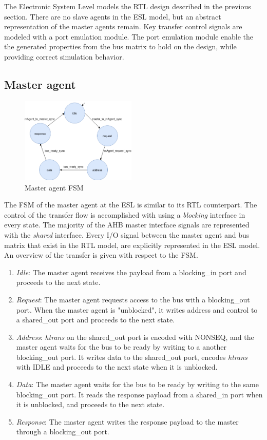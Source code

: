 The Electronic System Level models the RTL design described in the previous section. There are no slave agents in the ESL model, but an abstract representation of the master agents remain. Key transfer control signals are modeled with a port emulation module. The port emulation module enable the the generated properties from the bus matrix to hold on the design, while providing correct simulation behavior.  


\subsection{Master agent}
\begin{figure}
\includegraphics[width=5.5cm]{figs/ESL/mAgent_ESL.png}
\caption{Master agent FSM}\label{fig:eafsm}
\end{figure}
The FSM of the master agent at the ESL is similar to its RTL counterpart. The control of the transfer flow is accomplished with using a \textit{blocking} interface in every state. The majority of the AHB master interface signals are represented with the \textit{shared} interface. Every I/O signal between the master agent and bus matrix that exist in the RTL model, are explicitly represented in the ESL model. An overview of the transfer is given with respect to the FSM. \\
\vspace{0.5cm} 

\begin{enumerate}
 \item \textit{Idle}: The master agent receives the payload from a blocking\_in port and proceeds to the next state.
 \item \textit{Request}: The master agent requests access to the bus with a blocking\_out port. When the master agent is "unblocked", it writes address and control to a shared\_out port and proceeds to the next state.
 \item \textit{Address}: \textit{htrans} on the shared\_out port is encoded with NONSEQ, and the master agent waits for the bus to be ready by writing to a another blocking\_out port. It writes data to the shared\_out port, encodes \textit{htrans} with IDLE and proceeds to the next state when it is unblocked.
 \item \textit{Data}: The master agent waits for the bus to be ready by writing to the same blocking\_out port. It reads the response payload from a shared\_in port when it is unblocked, and proceeds to the next state. 
 \item \textit{Response}: The master agent writes the response payload to the master through a blocking\_out port. 
\end{enumerate} 

